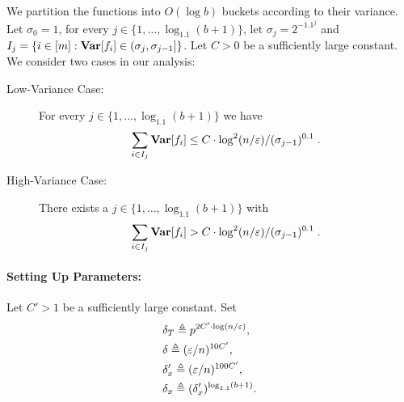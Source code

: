 We partition the functions into $O(\log b)$ buckets according to their variance.
Let $\sigma_0 = 1$, 
for every $j \in \{1,\ldots, \log_{1.1}(b+1)\}$, let $\sigma_j = 2^{-1.1^j}$ and
$I_j = \{i\in [m]: {\mathop{\bf Var\/}}[f_i] \in (\sigma_{j},\sigma_{j-1}]\}$.
Let $C>0$ be a sufficiently large constant.
We consider two cases in our analysis: \begin{description}
\item[Low-Variance Case:] 
For every $j \in \{1,\ldots, \log_{1.1}(b+1)\}$ we have
$$\sum_{i\in I_j} {\mathop{\bf Var\/}}[f_i] \le C \cdot \log^2(n/\varepsilon)/(\sigma_{j-1})^{0.1}\;.$$
\item[High-Variance Case:] 
There exists a $j \in \{1,\ldots, \log_{1.1}(b+1)\}$ with $$\sum_{i\in I_j} {\mathop{\bf Var\/}}[f_i] > C\cdot \log^2(n/\varepsilon)/(\sigma_{j-1})^{0.1}\;.$$
\end{description}

\paragraph{Setting Up Parameters:}
Let $C'>1$ be a sufficiently large constant.
Set 
\begin{align}
\label{eq:delta_T}
	&\delta_{T} \triangleq p^{2C' \cdot \log(n/\varepsilon)},\\
\label{eq:delta}
&\delta \triangleq  (\varepsilon/n)^{10 C'}, \\
\label{eq:delta'_x}
	&\delta'_x \triangleq (\varepsilon/n)^{100 C'},\\
\label{eq:delta_x}
	&\delta_x \triangleq  (\delta'_x)^{\log_{1.1}(b+1)}.
\end{align}

